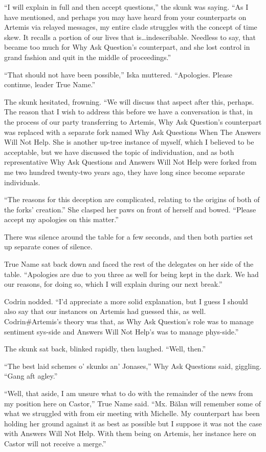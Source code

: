 ``I will explain in full and then accept questions,'' the skunk was saying. ``As I have mentioned, and perhaps you may have heard from your counterparts on Artemis via relayed messages, my entire clade struggles with the concept of time skew. It recalls a portion of our lives that is\ldots indescribable. Needless to say, that became too much for Why Ask Question's counterpart, and she lost control in grand fashion and quit in the middle of proceedings.''

``That should not have been possible,'' Iska muttered. ``Apologies. Please continue, leader True Name.''

The skunk hesitated, frowning. ``We will discuss that aspect after this, perhaps. The reason that I wish to address this before we have a conversation is that, in the process of our party transferring to Artemis, Why Ask Question's counterpart was replaced with a separate fork named Why Ask Questions When The Answers Will Not Help. She is another up-tree instance of myself, which I believed to be acceptable, but we have discussed the topic of individuation, and as both representative Why Ask Questions and Answers Will Not Help were forked from me two hundred twenty-two years ago, they have long since become separate individuals.

``The reasons for this deception are complicated, relating to the origins of both of the forks' creation.'' She clasped her paws on front of herself and bowed. ``Please accept my apologies on this matter.''

There was silence around the table for a few seconds, and then both parties set up separate cones of silence.

True Name sat back down and faced the rest of the delegates on her side of the table. ``Apologies are due to you three as well for being kept in the dark. We had our reasons, for doing so, which I will explain during our next break.''

Codrin nodded. ``I'd appreciate a more solid explanation, but I guess I should also say that our instances on Artemis had guessed this, as well. Codrin\#Artemis's theory was that, as Why Ask Question's role was to manage sentiment sys-side and Answers Will Not Help's was to manage phys-side.''

The skunk sat back, blinked rapidly, then laughed. ``Well, then.''

``The best laid schemes o' skunks an' Jonases,'' Why Ask Questions said, giggling. ``Gang aft agley.''

``Well, that aside, I am unsure what to do with the remainder of the news from my position here on Castor,'' True Name said. ``Mx. Bălan will remember some of what we struggled with from eir meeting with Michelle. My counterpart has been holding her ground against it as best as possible but I suppose it was not the case with Answers Will Not Help. With them being on Artemis, her instance here on Castor will not receive a merge.''


